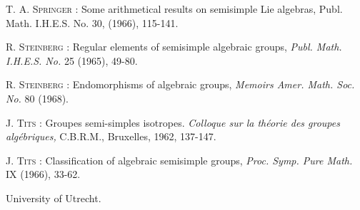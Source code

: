 \begin{thebibliography}{99}
 \textsc{T. A. Springer :} Some arithmetical results on semisimple Lie algebras, {\rm Publ. Math. I.H.E.S. No.} 30, (1966), 115-141.

 \textsc{R. Steinberg :} Regular elements of semisimple algebraic groups, {\em Publ. Math. I.H.E.S. No.} 25 (1965), 49-80.

 \textsc{R. Steinberg :} Endomorphisms of algebraic groups, {\em Memoirs Amer. Math. Soc. No.} 80 (1968).

 \textsc{J. Tits :} Groupes semi-simples isotropes. {\em Colloque sur la th\'eorie des groupes alg\'ebriques,} C.B.R.M., Bruxelles, 1962, 137-147.

 \textsc{J. Tits :} Classification of algebraic semisimple groups, {\em Proc. Symp. Pure Math.} IX (1966), 33-62.

\end{thebibliography}

\bigskip
\noindent
{\small University of Utrecht.}

